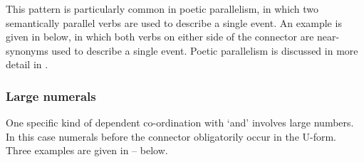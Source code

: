 \begin{exe}
	\label{ex:120715-3, 0.14}
\end{exe}

This pattern is particularly common in poetic parallelism,
in which two semantically parallel verbs are used to describe a single event.
An example is given in  below,
in which both verbs on either side of the connector 
are near-synonyms used to describe a single event.
Poetic parallelism is discussed in more detail in .

\begin{exe}
	\label{ex:160326, 1.50}
\end{exe}

\subsubsection{Large numerals}\label{sec:LarNum}
One specific kind of dependent co-ordination with  `and' involves large numbers.
In this case numerals before the connector  obligatorily occur in the U-form.
Three examples are given in -- below.

